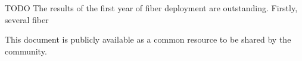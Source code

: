 TODO The results of the first year of fiber deployment are outstanding. Firstly, several fiber


This document is publicly available as a common resource to be shared by the community.
